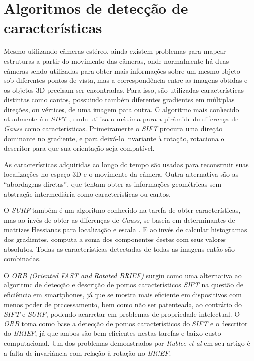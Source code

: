 \section{Algoritmos de detecção de características}
  
Mesmo utilizando câmeras estéreo, ainda existem problemas para mapear estruturas a partir do movimento das câmeras, onde normalmente há duas câmeras sendo utilizadas para obter mais informações sobre um mesmo objeto sob diferentes pontos de vista, mas a correspondência entre as imagens obtidas e os objetos 3D precisam ser encontradas. Para isso, são utilizadas características distintas como cantos, possuindo também diferentes gradientes em múltiplas direções, ou vértices, de uma imagem para outra. O algoritmo mais conhecido atualmente é o \textit{SIFT} \cite{SIFT}, onde utiliza a máxima para a pirâmide de diferença de \textit{Gauss} como características. Primeiramente o \textit{SIFT} procura uma direção dominante no gradiente, e para deixá-lo invariante à rotação, rotaciona o descritor para que sua orientação seja compatível.
  
  As características adquiridas ao longo do tempo são usadas para reconstruir suas localizações no espaço 3D e o movimento da câmera. Outra alternativa são as “abordagens diretas”, que tentam obter as informações geométricas sem abstração intermediária como características ou cantos.

O \textit{SURF}\cite{SURF} também é um algoritmo conhecido na tarefa de obter características, mas ao invés de obter as diferenças de \textit{Gauss}, se baseia em determinantes de matrizes Hessianas para localização e escala \cite{Hessian}. E ao invés de calcular histogramas dos gradientes, computa a soma dos componentes destes com seus valores absolutos. Todas as características detectadas de todas as imagens então são combinadas.

O \textit{ORB (Oriented FAST and Rotated BRIEF)} surgiu como uma alternativa ao algoritmo de detecção e descrição de pontos característicos \textit{SIFT} na questão de eficiência em smartphones, já que se mostra mais eficiente em dispositivos com menos poder de processamento, bem como não ser patenteado, ao contrário do \textit{SIFT} e \textit{SURF}, podendo acarretar em problemas de propriedade intelectual. O \textit{ORB} toma como base a detecção de pontos característicos do \textit{SIFT} e o descritor do \textit{BRIEF}, já que ambos são bem eficientes nestas tarefas e baixo custo computacional. Um dos problemas demonstrados por \textit{Rublee et al}\cite{ORB-Artigo} em seu artigo é a falta de invariância com relação à rotação no \textit{BRIEF}.

